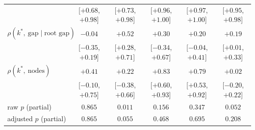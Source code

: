 \begin{table}[H]
\begin{tabular}{lccccc}
 & {\scriptsize [$+0.68$, $+0.98$]} & {\scriptsize [$+0.73$, $+0.98$]} & {\scriptsize [$+0.96$, $+1.00$]} & {\scriptsize [$+0.97$, $+1.00$]} & {\scriptsize [$+0.95$, $+0.98$]} \\[2pt]
$\rho(k^\ast,\ \text{gap}\mid\text{root gap})$ & $-0.04$ & $+0.52$ & $+0.30$ & $+0.20$ & $+0.19$ \\
 & {\scriptsize [$-0.35$, $+0.19$]} & {\scriptsize [$+0.28$, $+0.71$]} & {\scriptsize [$-0.34$, $+0.67$]} & {\scriptsize [$-0.04$, $+0.41$]} & {\scriptsize [$+0.01$, $+0.33$]} \\[2pt]
$\rho(k^\ast,\ \text{nodes})$ & $+0.41$ & $+0.22$ & $+0.83$ & $+0.79$ & $+0.02$ \\
 & {\scriptsize [$-0.10$, $+0.75$]} & {\scriptsize [$-0.38$, $+0.66$]} & {\scriptsize [$+0.60$, $+0.93$]} & {\scriptsize [$+0.53$, $+0.92$]} & {\scriptsize [$-0.20$, $+0.22$]} \\[2pt]
raw $p$ (partial) & $0.865$ & $0.011$ & $0.156$ & $0.347$ & $0.052$ \\
adjusted $p$ (partial) & $0.865$ & $0.055$ & $0.468$ & $0.695$ & $0.208$ \\
\hline
\end{tabular}
\end{table}
